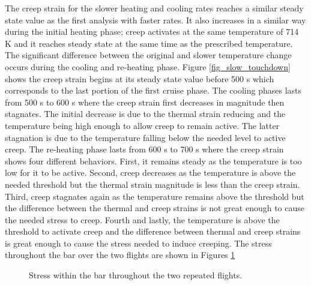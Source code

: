\documentclass[conf]{new-aiaa}
\begin{document}
The creep strain for the slower heating and cooling rates 
reaches a similar steady state value as the first analysis with faster rates.
It also increases in a similar way during the initial 
heating phase;
creep activates at the same temperature of 714 K and
it reaches steady state at the same time as the prescribed temperature.
The significant difference between the original and slower temperature
change occurs during the cooling and re-heating phase.
Figure \ref{fig_slow_touchdown} shows the creep strain
begins at its steady state value before 500 s
which corresponds to the last portion of the first cruise phase.
The cooling phases lasts from 500 s to 600 s where
the creep strain first decreases in magnitude then stagnates.
The initial decrease is due to the thermal strain reducing and
the temperature being high enough to allow creep to remain active.
The latter stagnation is due to the temperature falling below
the needed level to active creep. 
The re-heating phase lasts from 600 s to 700 s where the
creep strain shows four different behaviors.
First, it remains steady as the temperature is too low for it to be active.
Second, creep decreases as the temperature is above the needed threshold
but the thermal strain magnitude is less than the creep strain.
Third, creep stagnates again as the temperature remains 
above the threshold but the difference
between the thermal and creep strains is not great enough to cause
the needed stress to creep. 
Fourth and lastly, the temperature is above the threshold to activate 
creep and the difference between thermal and creep strains is 
great enough to cause the stress needed to induce creeping.
The stress 
throughout the bar
over the two flights are shown in Figures 
\ref{fig_slow_full_bar_stress} 

\begin{figure}[H]
  \centering
  \caption{ Stress within the bar throughout the two repeated flights.}
  \label{fig_slow_full_bar_stress}
\end{figure}
\end{document}
